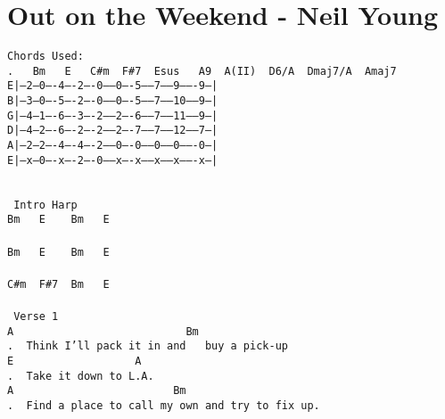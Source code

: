 \newpage
\section{Out on the Weekend - Neil Young}
\label{Out on the Weekend - Neil Young}
\texttt{Chords\ Used:\ \ \ \ \ \ \ \ \ \ \ \ \ \ \ \ \ \ \ \ \ \ \ \ \ \ \ \ \\
.\ \ \ Bm\ \ \ E\ \ \ C\#m\ \ F\#7\ \ Esus\ \ \ A9\ \ A(II)\ \ D6/A\ \ Dmaj7/A\ \ Amaj7\ \\
E|---2---0----4----2----0-----0----5------7------9-------9--|\\
B|---3---0----5----2----0-----0----5------7------10------9--|\\
G|---4---1----6----3----2-----2----6------7------11------9--|\\
D|---4---2----6----2----2-----2----7------7------12------7--|\\
A|---2---2----4----4----2-----0----0------0------0-------0--|\\
E|---x---0----x----2----0-----x----x------x------x-------x--|\\
\ \ \ \ \\
\ \ \ \ \ \ \ \ \ \ \ \ \ \ \ \ \ \ \ \ \ \ \ \ \ \ \ \ \ \ \ \\
\lbrack\ Intro\ Harp\rbrack\ \ \ \ \ \ \ \ \ \ \ \ \ \ \ \ \ \ \ \ \ \ \ \ \ \ \ \ \ \\
Bm\ \ \ E\ \ \ \ Bm\ \ \ E\ \ \ \ \ \ \ \ \ \ \ \ \ \ \ \ \ \ \ \ \\
\\
Bm\ \ \ E\ \ \ \ Bm\ \ \ E\ \ \ \ \ \ \ \ \ \ \ \ \ \ \ \ \ \ \ \ \\
\\
C\#m\ \ F\#7\ \ Bm\ \ \ E\\
\\
\lbrack\ Verse\ 1\rbrack\ \ \ \ \ \ \ \ \ \ \ \ \ \ \ \ \ \ \ \ \\
A\ \ \ \ \ \ \ \ \ \ \ \ \ \ \ \ \ \ \ \ \ \ \ \ \ \ \ Bm\ \ \ \ \ \ \ \ \ \ \ \ \ \ \ \ \ \ \ \ \\
.\ \ Think\ I'll\ pack\ it\ in\ and\ \ \ buy\ a\ pick-up\ \ \ \ \ \ \ \\
E\ \ \ \ \ \ \ \ \ \ \ \ \ \ \ \ \ \ \ A\ \ \ \ \ \ \ \ \ \ \ \ \ \ \ \ \ \ \ \ \ \ \ \ \ \ \ \ \ \\
.\ \ Take\ it\ down\ to\ L.A.\ \ \ \ \ \ \ \ \ \ \ \ \ \ \ \ \ \ \ \ \ \ \ \ \ \ \ \ \\
A\ \ \ \ \ \ \ \ \ \ \ \ \ \ \ \ \ \ \ \ \ \ \ \ \ Bm\ \ \ \ \ \ \ \ \ \ \ \ \ \ \ \ \ \ \ \ \ \ \\
.\ \ Find\ a\ place\ to\ call\ my\ own\ and\ try\ to\ fix\ up.\ \ \\
}
